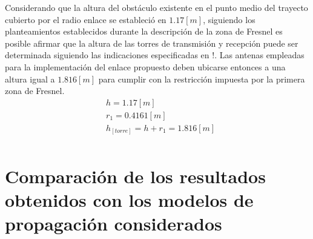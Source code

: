 \documentclass[conference]{IEEEtran}
\begin{document}
Considerando que la altura del obstáculo existente en el punto medio del trayecto cubierto por el radio enlace se estableció en $1.17[m]$, siguiendo 
los planteamientos establecidos durante la descripción de la zona de Fresnel es posible afirmar que la altura de las torres de transmisión y recepción 
puede ser determinada siguiendo las indicaciones especificadas en !. Las antenas empleadas para la implementación del enlace propuesto deben ubicarse entonces
a una altura igual a $1.816[m]$ para cumplir con la restricción impuesta por la primera zona de Fresnel.
\begin{equation}
    \label{eq:Eq3}
    \begin{aligned}
        &h =1.17[m]\\
        &r_1 = 0.4161[m]\\
        &h_[torre] = h+r_{1}=1.816[m]\\
    \end{aligned}
\end{equation}
\section{Comparación de los resultados obtenidos con los modelos de propagación considerados}
\end{document}
